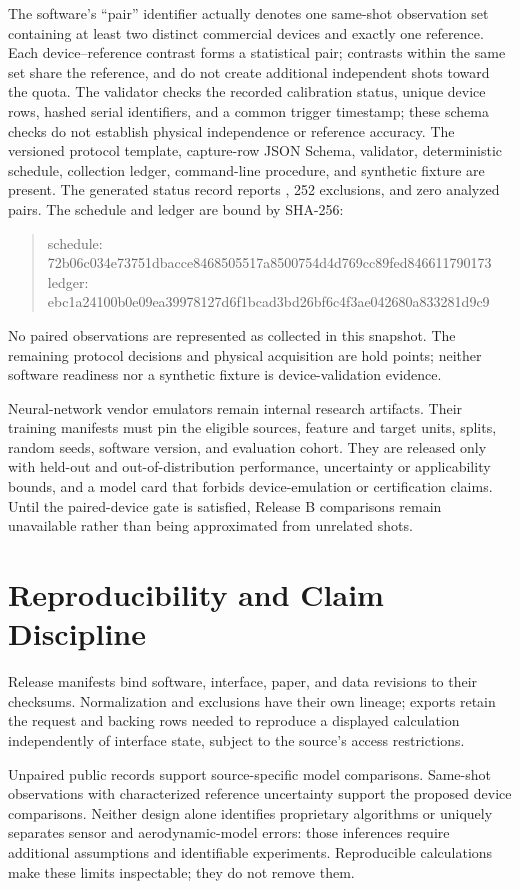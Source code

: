 The software's ``pair'' identifier actually denotes one same-shot observation set containing at least two distinct commercial devices and exactly one reference.
Each device--reference contrast forms a statistical pair; contrasts within the same set share the reference, and do not create additional independent shots toward the quota.
The validator checks the recorded calibration status, unique device rows, hashed serial identifiers, and a common trigger timestamp; these schema checks do not establish physical independence or reference accuracy.
The versioned protocol template, capture-row JSON Schema, validator, deterministic schedule, collection ledger, command-line procedure, and synthetic fixture are present.
The generated status record reports , 252  exclusions, and zero analyzed pairs.
The schedule and ledger are bound by SHA-256:
\begin{quote}
\small\ttfamily
schedule: 72b06c034e73751dbacce8468505517a8500754d4d769cc89fed846611790173\\
ledger: ebc1a24100b0e09ea39978127d6f1bcad3bd26bf6c4f3ae042680a833281d9c9
\end{quote}
No paired observations are represented as collected in this snapshot.
The remaining protocol decisions and physical acquisition are hold points; neither software readiness nor a synthetic fixture is device-validation evidence.

Neural-network vendor emulators remain internal research artifacts. Their
training manifests must pin the eligible sources, feature and target units,
splits, random seeds, software version, and evaluation cohort. They are
released only with held-out and out-of-distribution performance, uncertainty
or applicability bounds, and a model card that forbids device-emulation or
certification claims. Until the paired-device gate is satisfied, Release B
comparisons remain unavailable rather than being approximated from unrelated
shots.

\section{Reproducibility and Claim Discipline}

Release manifests bind software, interface, paper, and data revisions to their checksums.
Normalization and exclusions have their own lineage; exports retain the request and backing rows needed to reproduce a displayed calculation independently of interface state, subject to the source's access restrictions.

Unpaired public records support source-specific model comparisons.
Same-shot observations with characterized reference uncertainty support the proposed device comparisons.
Neither design alone identifies proprietary algorithms or uniquely separates sensor and aerodynamic-model errors: those inferences require additional assumptions and identifiable experiments.
Reproducible calculations make these limits inspectable; they do not remove them.
